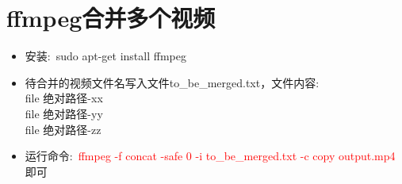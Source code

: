 \documentclass{article}      %
\begin{document}
\section{ffmpeg合并多个视频}
\begin{itemize}
	\item 安装:~\textrm{sudo apt-get install ffmpeg}
	\item 待合并的视频文件名写入文件\textrm{to\_be\_merged.txt}，文件内容:\\
		\textrm{file 绝对路径-xx}\\
		\textrm{file 绝对路径-yy}\\
		\textrm{file 绝对路径-zz}
	\item 运行命令:~\textcolor{red}{\textrm{ffmpeg -f concat -safe 0 -i to\_be\_merged.txt -c copy output.mp4}}即可
\end{itemize}









\end{document}
